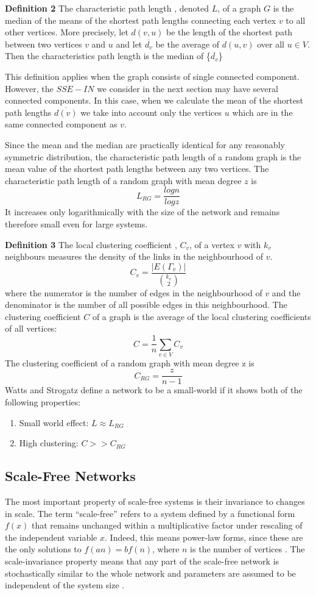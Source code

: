 \textbf{Definition 2} The characteristic path length \cite{watts1999small}, denoted $L$, of a graph $G$ is the median of the means of the shortest path lengths connecting each vertex $v$ to all other vertices. More precisely, let $d(v, u)$ be the length of the shortest path between two vertices $v$ and $u$ and let $\overline{d_v}$ be the average of $d(u,v)$ over all $u \in V$. Then the characteristics path length is the median of \{$\overline{d_v}$\}

This definition applies when the graph consists of single connected component. However, the $SSE-IN$ we consider in the next section may have several connected components. In this case, when we calculate the mean of the shortest path lengths $\overline{d(v)}$ we take into account only the vertices $u$ which are in the same connected component as $v$.

Since the mean and the median are practically identical for any reasonably symmetric distribution, the characteristic path length of a random graph is the mean value of the shortest path lengths between any two vertices. The characteristic path length of a random graph with mean degree $z$ is 
\[ L_{RG} = \frac{log n} {log z} \]
It increases only logarithmically with the size of the network and remains therefore small even for large systems.

\textbf{Definition 3} The local clustering coefficient \cite{watts1999small}, $C_v$, of a vertex $v$ with $k_v$ neighbours measures the density of the links in the neighbourhood of $v$.
\[ C_v = \frac{|E({\Gamma}_v)|}{{k_v \choose 2}} \]
where the numerator is the number of edges in the neighbourhood of $v$ and the denominator is the number of all possible edges in this neighbourhood. The clustering coefficient $C$ of a graph is the average of the local clustering coefficients of all vertices:
\[ C = \frac{1}{n} \sum_{v\in V} C_v\]
The clustering coefficient of a random graph with mean degree z is 
\[ C_{RG} = \frac{z}{n-1}\]
Watts and Strogatz \cite{watts1999small} define a network to be a small-world if it shows both of the following properties:
\begin{enumerate}
\item Small world effect: $L \approx L_{RG}$
\item High clustering: $C >> C_{RG}$
\end{enumerate}

\subsection {Scale-Free Networks}
The most important property of scale-free systems is their invariance to changes in scale. The term \enquote{scale-free} refers to a system defined by a functional form $f(x)$ that remains unchanged within a multiplicative factor under rescaling of the independent variable $x$. Indeed, this means power-law forms, since these are the only solutions to $f(an) = b f(n)$, where $n$ is the number of vertices \cite{newman2002structure}. The scale-invariance property means that any part of the scale-free network is stochastically similar to the whole network and parameters are assumed to be independent of the system size \cite{jeong2000large}.

